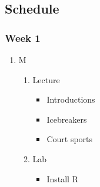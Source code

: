 \documentclass{article}
\begin{document}
\subsection{Schedule}
\label{sec:org22759bf}
\subsubsection{Week 1}
\label{sec:org8808697}
\begin{enumerate}
\item M
\label{sec:org8a8228d}
\begin{enumerate}
\item Lecture
\label{sec:org7e454a0}
\begin{itemize}
\item Introductions
\item Icebreakers
\item Court sports
\end{itemize}
\item Lab
\label{sec:orgc32c1d6}
\begin{itemize}
\item Install R
\end{itemize}
\end{enumerate}


\end{enumerate}
\end{document}
